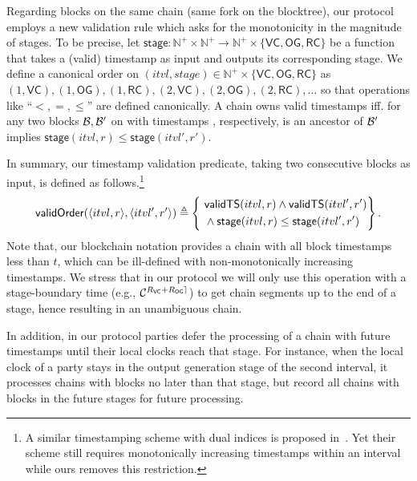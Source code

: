 Regarding blocks on the same chain (same fork on the blocktree), our protocol employs a new validation rule which asks for the monotonicity in the magnitude of stages.
%
To be precise, let $\mathsf{stage}: \mathbb{N}^+ \times \mathbb{N}^+ \rightarrow \mathbb{N}^+ \times \{ \mathsf{VC}, \mathsf{OG}, \mathsf{RC} \}$ be a function that takes a (valid) timestamp as input and outputs its corresponding stage.
%
We define a canonical order on $(itvl, stage) \in \mathbb{N}^+ \times \{ \mathsf{VC}, \mathsf{OG}, \mathsf{RC} \}$ as $(1, \mathsf{VC}), (1, \mathsf{OG}), (1, \mathsf{RC}), (2, \mathsf{VC}), (2, \mathsf{OG}), (2, \mathsf{RC}), \ldots$ so that operations like ``$<, =, \le$'' are defined canonically.
%
A chain \chain owns valid timestamps iff. for any two blocks $\mathcal{B}, \mathcal{B}'$ on \chain with timestamps ,  respectively, \block is an ancestor of $\mathcal{B}'$ implies $\mathsf{stage}(itvl, r) \le \mathsf{stage}(itvl', r')$.

In summary, our timestamp validation predicate, taking two consecutive blocks as input, is defined as follows.\footnote{A similar timestamping scheme with dual indices is proposed in~\cite{TCC:GarKiaShe22}. Yet their scheme still requires monotonically increasing timestamps within an interval while ours removes this restriction.}
%
\begin{equation} \label{eq:valid-timestamp-order}
      \mathsf{validOrder}(\langle itvl, r \rangle, \langle itvl', r' \rangle)
      \triangleq
      \left\{~
      \begin{aligned}
             & \textsf{validTS}(itvl, r) \wedge \textsf{validTS}(itvl', r') \\ &\wedge \mathsf{stage}(itvl, r) \le \mathsf{stage}(itvl', r')
      \end{aligned}
      \right\}.
\end{equation}
%
Note that, our blockchain notation  provides a chain with all block timestamps less than $t$, which can be ill-defined with non-monotonically increasing timestamps.
%
We stress that in our protocol we will only use this operation with a stage-boundary time (e.g., $\mathcal{C}^{{R_{\mathsf{VC}} + R_{\mathsf{OG}}}\rceil}$) to get chain segments up to the end of a stage, hence resulting in an unambiguous chain.

In addition, in our protocol parties defer the processing of a chain with future timestamps until their local clocks reach that stage.
%
For instance, when the local clock of a party stays in the output generation stage of the second interval, it processes chains with blocks no later than that stage, but record all chains with blocks in the future stages for future processing.

